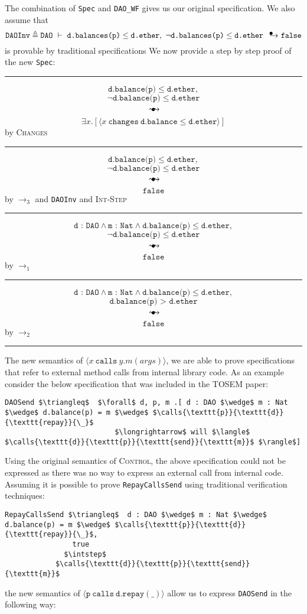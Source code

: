 \documentclass[12pt]{article}
\newcommand\trans{\mathlarger{\mathlarger \leadsto}}
\newcommand\intstep{\hspace{1.5mm}{\raisebox{3pt}{$\bullet$}}\hspace{-1.5mm}{\hookrightarrow}}
\newcommand\ot{\hspace{2mm}{\raisebox{1pt}{$\bullet$}}\hspace{-3mm}{\trans}}
\newcommand\oiInternal[3]{#1,\ #2\ \intstep\ #3}
\newcommand\calls[4]{\langle #1\ \texttt{calls}\ #2.#3(#4) \rangle}
\newcommand\changes[2]{\langle #1\ \texttt{changes}\ #2 \rangle}
\numberwithin{case}{lemma}
\numberwithin{case}{theorem}
\numberwithin{subcase}{case}
\begin{document}
The combination of \texttt{Spec} and \texttt{DAO\_WF} gives us our original specification.
We also assume that 
$$\texttt{DAOInv}\triangleq\texttt{DAO}\ \vdash\ \oiInternal{\texttt{d.balances(p)} \leq \texttt{d.ether}}{\neg \texttt{d.balances(p)} \leq \texttt{d.ether}}{\texttt{false}}$$
is provable by traditional specifications
We now provide a step by step proof of the new \texttt{Spec}:
\vspace{3mm}
\footnotesize
\hrule
\vspace{3mm}
$$
	\texttt{d.balance(p)} \leq \texttt{d.ether},
$$
$$
	\neg\texttt{d.balance(p)} \leq \texttt{d.ether}
$$
$$\ot$$
$$
	\exists x.[\changes{x}{\texttt{d.balance} \leq \texttt{d.ether}}]
$$
\normalsize
\hfill by \textsc{Changes}
\hrule
\vspace{3mm}
\footnotesize
$$
	\texttt{d.balance(p)} \leq \texttt{d.ether},
$$
$$
	\neg\texttt{d.balance(p)} \leq \texttt{d.ether}
$$
$$\ot$$
$$
	\texttt{false}
$$
\normalsize
\hfill by $\longrightarrow_3$ and \texttt{DAOInv} and \textsc{Int-Step}
\hrule
\vspace{3mm}
\footnotesize
$$
	\texttt{d : DAO} \wedge \texttt{m : Nat} \wedge \texttt{d.balance(p)} \leq \texttt{d.ether},
$$
$$
	\neg\texttt{d.balance(p)} \leq \texttt{d.ether}
$$
$$\ot$$
$$
	\texttt{false}
$$
\normalsize
\hfill by $\longrightarrow_1$
\hrule
\vspace{3mm}
\footnotesize
$$
	\texttt{d : DAO} \wedge \texttt{m : Nat} \wedge \texttt{d.balance(p)} \leq \texttt{d.ether},
$$
$$
	\texttt{d.balance(p) > d.ether}
$$
$$\ot$$
$$
	\texttt{false}
$$
\normalsize
\hfill by $\longrightarrow_2$
\hrule

The new semantics of $\calls{x}{y}{m}{args}$, we are able to prove 
specifications that refer to external method calls from internal 
library code. As an example consider the below specification
that was included in the TOSEM paper:
\begin{lstlisting}[mathescape=true]
DAOSend $\triangleq$  $\forall$ d, p, m .[ d : DAO $\wedge$ m : Nat $\wedge$ d.balance(p) = m $\wedge$ $\calls{\texttt{p}}{\texttt{d}}{\texttt{repay}}{\_}$
                          $\longrightarrow$ will $\langle$ $\calls{\texttt{d}}{\texttt{p}}{\texttt{send}}{\texttt{m}}$ $\rangle$]
\end{lstlisting}
Using the original semantics of \textsc{Control}, the above specification could not be expressed as there was no way to express an external call from internal code.
Assuming it is possible to prove \texttt{RepayCallsSend} using traditional verification techniques:
\begin{lstlisting}[mathescape=true]
RepayCallsSend $\triangleq$  d : DAO $\wedge$ m : Nat $\wedge$ d.balance(p) = m $\wedge$ $\calls{\texttt{p}}{\texttt{d}}{\texttt{repay}}{\_}$,
				true
              $\intstep$
            $\calls{\texttt{d}}{\texttt{p}}{\texttt{send}}{\texttt{m}}$
\end{lstlisting}
the new semantics of $\calls{\texttt{p}}{\texttt{d}}{\texttt{repay}}{\_}$ allow us to express \texttt{DAOSend} in the following way:
\end{document}
